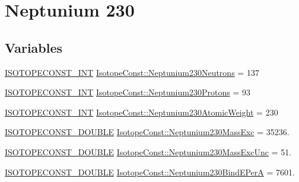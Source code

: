 \hypertarget{group___isotope_const-_neptunium-_np230}{}\section{Neptunium 230}
\label{group___isotope_const-_neptunium-_np230}
\subsection*{Variables}
\begin{DoxyCompactItemize}
\item 
\mbox{\hyperlink{group___isotope_const-_macros_ga5f18360b3e99483a35c32d789e62621c}{I\+S\+O\+T\+O\+P\+E\+C\+O\+N\+S\+T\+\_\+\+I\+NT}} \mbox{\hyperlink{group___isotope_const-_neptunium-_np230_gaa80a3c5d545dd76c489c59d8ae83605d}{Isotope\+Const\+::\+Neptunium230\+Neutrons}} = 137
\item 
\mbox{\hyperlink{group___isotope_const-_macros_ga5f18360b3e99483a35c32d789e62621c}{I\+S\+O\+T\+O\+P\+E\+C\+O\+N\+S\+T\+\_\+\+I\+NT}} \mbox{\hyperlink{group___isotope_const-_neptunium-_np230_ga06b138f75423f81dc9ef20cd0afc4190}{Isotope\+Const\+::\+Neptunium230\+Protons}} = 93
\item 
\mbox{\hyperlink{group___isotope_const-_macros_ga5f18360b3e99483a35c32d789e62621c}{I\+S\+O\+T\+O\+P\+E\+C\+O\+N\+S\+T\+\_\+\+I\+NT}} \mbox{\hyperlink{group___isotope_const-_neptunium-_np230_gac6b5038ac73580bef6952ef13cfed27a}{Isotope\+Const\+::\+Neptunium230\+Atomic\+Weight}} = 230
\item 
\mbox{\hyperlink{group___isotope_const-_macros_ga8f45a7272ce02c0b4c65c44636ed719a}{I\+S\+O\+T\+O\+P\+E\+C\+O\+N\+S\+T\+\_\+\+D\+O\+U\+B\+LE}} \mbox{\hyperlink{group___isotope_const-_neptunium-_np230_gae678b446253cc11aefc017a59ac1e30a}{Isotope\+Const\+::\+Neptunium230\+Mass\+Exc}} = 35236.
\item 
\mbox{\hyperlink{group___isotope_const-_macros_ga8f45a7272ce02c0b4c65c44636ed719a}{I\+S\+O\+T\+O\+P\+E\+C\+O\+N\+S\+T\+\_\+\+D\+O\+U\+B\+LE}} \mbox{\hyperlink{group___isotope_const-_neptunium-_np230_ga462793b7239b30f35d948aa3d76996a8}{Isotope\+Const\+::\+Neptunium230\+Mass\+Exc\+Unc}} = 51.
\item 
\mbox{\hyperlink{group___isotope_const-_macros_ga8f45a7272ce02c0b4c65c44636ed719a}{I\+S\+O\+T\+O\+P\+E\+C\+O\+N\+S\+T\+\_\+\+D\+O\+U\+B\+LE}} \mbox{\hyperlink{group___isotope_const-_neptunium-_np230_ga2953bacff2e1e6fa4b500c5e50b0ca50}{Isotope\+Const\+::\+Neptunium230\+Bind\+E\+PerA}} = 7601.
\item 

\end{DoxyCompactItemize}
